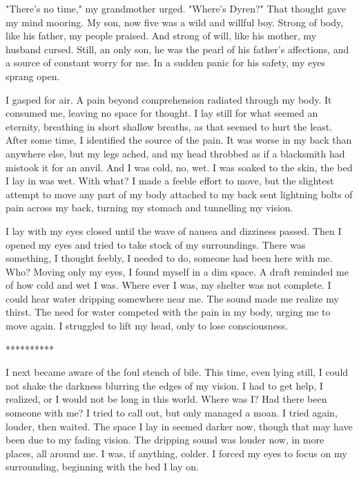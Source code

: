 "There's no time," my grandmother urged. "Where's Dyren?" That thought gave my mind mooring. My son, now five was a wild and willful boy. Strong of body, like his father, my people praised. And strong of will, like his mother, my husband cursed. Still, an only son, he was the pearl of his father's affections, and a source of constant worry for me. In a sudden panic for his safety, my eyes sprang open.

I gasped for air. A pain beyond comprehension radiated through my body. It consumed me, leaving no space for thought. I lay still for what seemed an eternity, breathing in short shallow breaths, as that seemed to hurt the least. After some time, I identified the source of the pain. It was worse in my back than anywhere else, but my legs ached, and my head throbbed as if a blacksmith had mistook it for an anvil. And I was cold, no, wet. I was soaked to the skin, the bed I lay in was wet. With what? I made a feeble effort to move, but the slightest attempt to move any part of my body attached to my back sent lightning bolts of pain across my back, turning my stomach and tunnelling my vision.

I lay with my eyes closed until the wave of nausea and dizziness passed. Then I opened my eyes and tried to take stock of my surroundings. There was something, I thought feebly, I needed to do, someone had been here with me. Who? Moving only my eyes, I found myself in a dim space. A draft reminded me of how cold and wet I was. Where ever I was, my shelter was not complete. I could hear water dripping somewhere near me. The sound made me realize my thirst. The need for water competed with the pain in my body, urging me to move again. I struggled to lift my head, only to lose consciousness.

**********

I next became aware of the foul stench of bile. This time, even lying still, I could not shake the darkness blurring the edges of my vision. I had to get help, I realized, or I would not be long in this world. Where was I? Had there been someone with me? I tried to call out, but only managed a moan. I tried again, louder, then waited. The space I lay in seemed darker now, though that may have been due to my fading vision. The dripping sound was louder now, in more places, all around me. I was, if anything, colder. I forced my eyes to focus on my surrounding, beginning with the bed I lay on.


